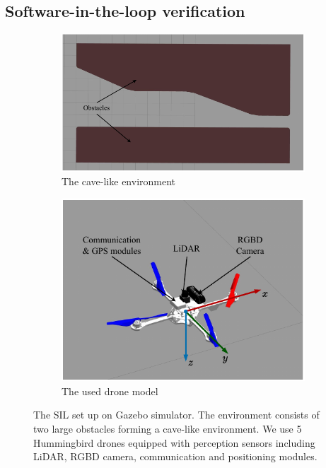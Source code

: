 \subsection{Software-in-the-loop verification}
\begin{figure}[h!]
    \centering
    \begin{subfigure}[b]{0.56\textwidth}
    \includegraphics[width=\textwidth]{paper3/images/tunnel.pdf}
    \caption{The cave-like environment}
    \label{fig:gazebo_tunnel}
    \end{subfigure}
    \begin{subfigure}[b]{0.42\textwidth}
    \includegraphics[width=\textwidth]{paper3/images/hummingbird.pdf}
    \caption{The used drone model~\cite{Bui2022,Furrer2016}}
    \label{fig:gazebo_hummingbird}
    \end{subfigure}
    \caption{The SIL set up on Gazebo simulator. The environment consists of two large obstacles forming a cave-like environment. We use 5 Hummingbird drones equipped with perception sensors including LiDAR, RGBD camera, communication and positioning modules.}
    \label{fig:sil}
\end{figure}
